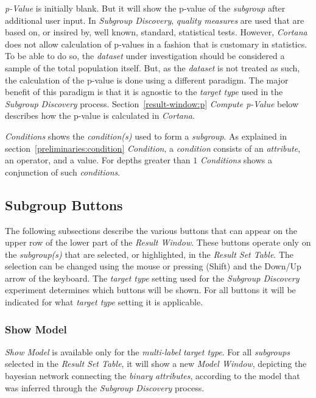 \documentclass{article}
\begin{document}
\emph{p-Value} is initially blank.
But it will show the p-value of the \emph{subgroup} after additional user input.
In \emph{Subgroup Discovery}, \emph{quality measures} are used that are based on, or insired by, well known, standard, statistical tests.
However, \emph{Cortana} does not allow calculation of p-values in a fashion that is customary in statistics.
To be able to do so, the \emph{dataset} under investigation should be considered a sample of the total population itself.
But, as the \emph{dataset} is not treated as such, the calculation of the p-value is done using a different paradigm.
The major benefit of this paradigm is that it is agnostic to the \emph{target type} used in the \emph{Subgroup Discovery} process.
Section~\ref{result-window:p} \emph{Compute p-Value} below describes how the p-value is calculated in \emph{Cortana}.

\emph{Conditions} shows the \emph{condition(s)} used to form a \emph{subgroup}.
As explained in section~\ref{preliminaries:condition} \emph{Condition}, a \emph{condition} consists of an \emph{attribute}, an operator, and a value.
For depths greater than $1$ \emph{Conditions} shows a conjunction of such \emph{conditions}.



\subsection{Subgroup Buttons}
\label{result-window:subgroup-buttons}
The following subsections describe the various buttons that can appear on the upper row of the lower part of the \emph{Result Window}.
These buttons operate only on the \emph{subgroup(s)} that are selected, or highlighted, in the \emph{Result Set Table}.
The selection can be changed using the mouse or pressing (Shift) and the Down/Up arrow of the keyboard.
The \emph{target type} setting used for the \emph{Subgroup Discovery} experiment determines which buttons will be shown.
For all buttons it will be indicated for what \emph{target type} setting it is applicable.



\subsubsection{Show Model}
\label{result-window:model}
\emph{Show Model} is available only for the \emph{multi-label} \emph{target type}.
For all \emph{subgroups} selected in the \emph{Result Set Table}, it will show a new \emph{Model Window}, depicting the bayesian network connecting the \emph{binary} \emph{attributes}, according to the model that was inferred through the \emph{Subgroup Discovery} process.
\end{document}

